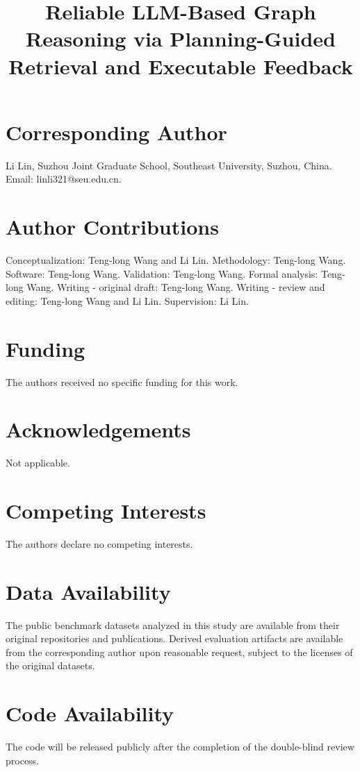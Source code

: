 \documentclass[pdflatex,sn-mathphys-num]{sn-jnl}
\begin{document}
\title[Reliable LLM-Based Graph Reasoning]{Reliable LLM-Based Graph Reasoning via Planning-Guided Retrieval and Executable Feedback}

\author[1]{ }
\author*[1]{ }


\maketitle

\section*{Corresponding Author}
Li Lin, Suzhou Joint Graduate School, Southeast University, Suzhou, China. Email: linli321@seu.edu.cn.

\section*{Author Contributions}
Conceptualization: Teng-long Wang and Li Lin. Methodology: Teng-long Wang. Software: Teng-long Wang. Validation: Teng-long Wang. Formal analysis: Teng-long Wang. Writing - original draft: Teng-long Wang. Writing - review and editing: Teng-long Wang and Li Lin. Supervision: Li Lin.

\section*{Funding}
The authors received no specific funding for this work.

\section*{Acknowledgements}
Not applicable.

\section*{Competing Interests}
The authors declare no competing interests.

\section*{Data Availability}
The public benchmark datasets analyzed in this study are available from their original repositories and publications. Derived evaluation artifacts are available from the corresponding author upon reasonable request, subject to the licenses of the original datasets.

\section*{Code Availability}
The code will be released publicly after the completion of the double-blind review process.
\end{document}
